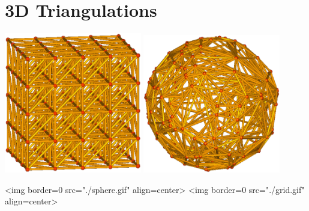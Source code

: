 \chapter{3D Triangulations}
\label{chapter-Triangulation3}

\vspace*{-1cm}
\minitoc

\begin{ccTexOnly}
\begin{center}
\includegraphics[width=6cm]{grid.eps} \hspace*{2cm} 
\includegraphics[width=6cm]{sphere.eps} 
\end{center}
\end{ccTexOnly}
\begin{ccHtmlOnly}
<img border=0 src="./sphere.gif" align=center>
<img border=0 src="./grid.gif" align=center>
\end{ccHtmlOnly}

